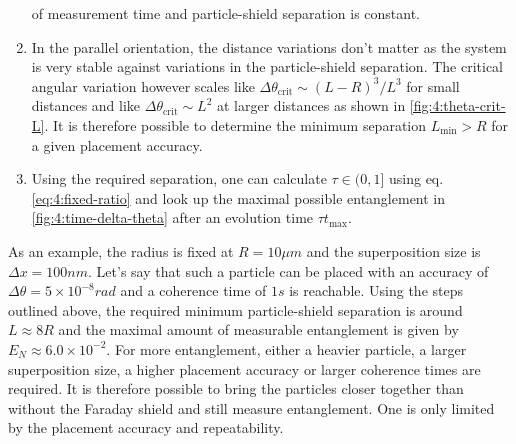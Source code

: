 \begin{enumerate}
  of measurement time and particle-shield separation is constant.
  \item In the parallel orientation, the distance variations don't matter as the system is very stable against variations in the particle-shield separation. The critical angular variation however scales like $\Delta \theta_\mathrm{crit} \sim (L-R)^3/L^3$ for small distances and like $\Delta \theta_\mathrm{crit} \sim L^2$ at larger distances as shown in \cref{fig:4:theta-crit-L}. It is therefore possible to determine the minimum separation $L_\mathrm{min} > R$ for a given placement accuracy.
  \item Using the required separation, one can calculate $\tau \in (0, 1]$ using eq. \eqref{eq:4:fixed-ratio} and look up the maximal possible entanglement in \cref{fig:4:time-delta-theta} after an evolution time $\tau t_\mathrm{max}$.
\end{enumerate}
As an example, the radius is fixed at $R=10\si{\mu m}$ and the superposition size is $\Delta x = 100\si{nm}$. Let's say that such a particle can be placed with an accuracy of $\Delta \theta = 5 \times 10^{-8} \si{rad}$ and a coherence time of $1\si{s}$ is reachable. 
Using the steps outlined above, the required minimum particle-shield separation is around $L\approx 8R$ and the maximal amount of measurable entanglement is given by $E_N \approx 6.0\times 10^{-2}$.
For more entanglement, either a heavier particle, a larger superposition size, a higher placement accuracy or larger coherence times are required. 
It is therefore possible to bring the particles closer together than without the Faraday shield and still measure entanglement.
One is only limited by the placement accuracy and repeatability.